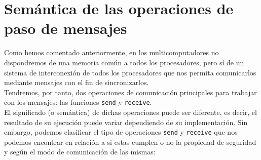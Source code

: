 \section{Semántica de las operaciones de paso de mensajes}
Como hemos comentado anteriormente, en los multicomputadores no dispondremos de una memoria común a todos los procesadores, pero sí de un sistema de interconexión de todos los procesadores que nos permita comunicarlos mediante mensajes con el fin de sincronizarlos.\\

Tendremos, por tanto, dos operaciones de comunicación principales para trabajar con los mensajes: las funciones \verb|send| y \verb|receive|.\\

El significado (o semántica) de dichas operaciones puede ser diferente, es decir, el resultado de su ejecución puede variar dependiendo de su implementación. Sin embargo, podemos clasificar el tipo de operaciones \verb|send| y \verb|receive| que nos podemos encontrar en relación a si estas cumplen o no la propiedad de seguridad y según el modo de comunicación de las mismas:

